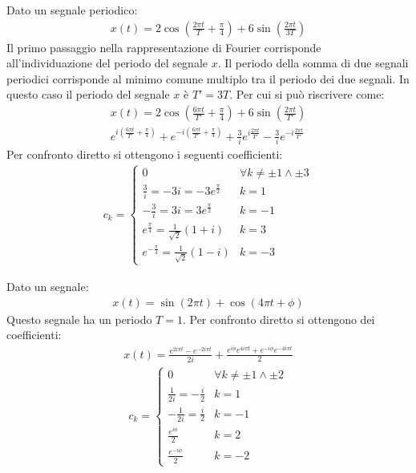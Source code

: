\documentclass{article}
\begin{document}
Dato un segnale periodico:
\begin{gather*}
    x(t)=2\cos\displaystyle\left(\frac{2\pi t}{T}+\frac{\pi}{4}\right)+6\sin\left(\frac{2\pi t}{3T}\right)
\end{gather*}
Il primo passaggio nella rappresentazione di Fourier corrisponde all'individuazione del periodo del segnale $x$. Il periodo della somma di due segnali periodici corrisponde 
al minimo comune multiplo tra il periodo dei due segnali. In questo caso il periodo del segnale $x$ è $T'=3T$. Per cui si può riscrivere come:
\begin{gather*}
    x(t)=\displaystyle2\cos\left(\frac{6\pi t}{T'}+\frac{\pi}{4}\right)+6\sin\left(\frac{2\pi t}{T'}\right)\\
    \displaystyle e^{i\left(\frac{6\pi t}{T'}+\frac{\pi}{4}\right)}+e^{-i\left(\frac{6\pi t}{T'}+\frac{\pi}{4}\right)}+\frac{3}{i}e^{i\frac{2\pi t}{T'}}-\frac{3}{i}e^{-i\frac{2\pi t}{T'}}
\end{gather*} 
Per confronto diretto si ottengono i seguenti coefficienti:
\begin{gather}
    c_k=
    \begin{cases}
        0&\forall k\neq\pm1\land\pm3\\
        \displaystyle\frac{3}{i}=-3i=-3e^{\frac{\pi}{2}} &k=1\\
        -\displaystyle\frac{3}{i}=3i=3e^{\frac{\pi}{2}}&k=-1\\
        \displaystyle e^{\frac{\pi}{4}}=\frac{1}{\sqrt{2}}(1+i)&k=3\\
        \displaystyle e^{-\frac{\pi}{4}}=\frac{1}{\sqrt{2}}(1-i)&k=-3
    \end{cases}
\end{gather}


Dato un segnale:
\begin{gather*}
    x(t)=\sin\displaystyle(2\pi t)+\cos(4\pi t+\phi)
\end{gather*}
Questo segnale ha un periodo $T=1$. Per confronto diretto si ottengono dei coefficienti:
\begin{gather*}
    x(t)=\displaystyle \frac{e^{2i\pi t}-e^{-2i\pi t}}{2i}+\frac{e^{i\phi}e^{4i\pi t}+e^{-i\phi}e^{-4i\pi t}}{2}
\end{gather*}
\begin{gather}
    c_k=
    \begin{cases}
        0&\forall k\neq\pm1\land\pm2\\
        \displaystyle\frac{1}{2i}=-\frac{i}{2} &k=1\\
        -\displaystyle\frac{1}{2i}=\frac{i}{2}&k=-1\\
        \displaystyle\frac{e^{i\phi}}{2}&k=2\\
        \displaystyle\frac{e^{-i\phi}}{2}&k=-2
    \end{cases}
\end{gather}
\end{document}
